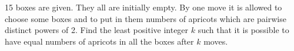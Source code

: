 15 boxes are given. They all  are initially empty. By one move it is allowed to choose some boxes and to put in them numbers of apricots which are pairwise distinct powers of 2. Find the least positive integer $k$ such that it is possible
to have equal numbers of apricots in all the boxes after $k$ moves.